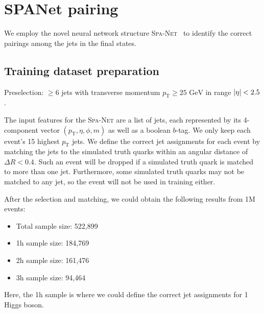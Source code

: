 \documentclass[12pt]{article}
\begin{document}
\section{SPANet pairing}%
\label{sec:spanet_pairing}
	We employ the novel neural network structure \textsc{Spa-Net}~\cite{PhysRevD.105.112008, Fenton:2023ikr, 10.21468/SciPostPhys.12.5.178} to identify the correct pairings among the jets in the final states.
	\subsection{Training dataset preparation}%
	\label{sub:training_dataset_preparation}
		Preselection: $\ge 6$ jets with transverse momentum $p_{\text{T}} \ge \text{25 GeV}$ in range $\abs{\eta} < 2.5$.

		The input features for the \textsc{Spa-Net} are a list of jets, each represented by its 4-component vector $(p_\text{T}, \eta, \phi, m)$ as well as a boolean $b$-tag. We only keep each event's 15 highest $p_\text{T}$ jets. We define the correct jet assignments for each event by matching the jets to the simulated truth quarks within an angular distance of $\Delta R < 0.4$. Such an event will be dropped if a simulated truth quark is matched to more than one jet. Furthermore, some simulated truth quarks may not be matched to any jet, so the event will not be used in training either. 

		After the selection and matching, we could obtain the following results from 1M events:
		\begin{itemize}
			\item Total sample size: 522,899
			\item 1h sample size: 184,769
			\item 2h sample size: 161,476
			\item 3h sample size: 94,464
		\end{itemize}
		Here, the 1h sample is where we could define the correct jet assignments for 1 Higgs boson. 
\end{document}
